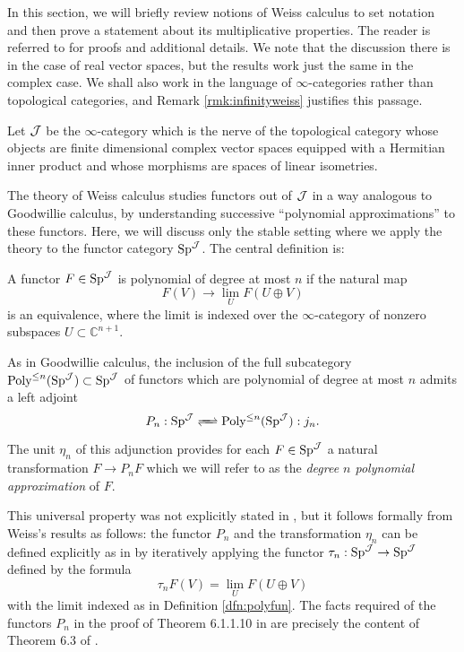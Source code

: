 

In this section, we will briefly review notions of Weiss calculus to set notation and then prove a statement about its multiplicative properties.  The reader is referred to \cite{Weiss} for proofs and additional details.  We note that the discussion there is in the case of real vector spaces, but the results work just the same in the complex case.  We shall also work in the language of $\infty$-categories rather than topological categories, and Remark \ref{rmk:infinityweiss} justifies this passage.  

Let $\operatorname{\mathcal{J}}$ be the $\infty$-category which is the nerve of the topological category whose objects are finite dimensional complex vector spaces equipped with a Hermitian inner product and whose morphisms are spaces of linear isometries.  

The theory of Weiss calculus studies functors out of $\operatorname{\mathcal{J}}$ in a way analogous to Goodwillie calculus, by understanding successive ``polynomial approximations'' to these functors.  Here, we will discuss only the stable setting where we apply the theory to the functor category $\operatorname{\text{Sp}}^{\operatorname{\mathcal{J}}}$. The central definition is:

\begin{dfn}\label{dfn:polyfun}
A functor $F\in \operatorname{\text{Sp}}^{\operatorname{\mathcal{J}}}$ is polynomial of degree at most $n$ if the natural map $$F(V) \to \lim_U F(U\oplus V)$$ is an equivalence, where the limit is indexed over the $\infty$-category of nonzero subspaces $U\subset \mathbb{C}^{n+1}.$
\end{dfn}

As in Goodwillie calculus, the inclusion of the full subcategory $\operatorname{\text{Poly}}^{\leq n}(\operatorname{\text{Sp}}^{\operatorname{\mathcal{J}}}) \subset \operatorname{\text{Sp}}^{\operatorname{\mathcal{J}}}$ of functors which are polynomial of degree at most $n$ admits a left adjoint $$P_n: \Sp^{\J} \xrightleftharpoons{\quad} \Poly^{\leq n}(\Sp^{\J}): j_n.$$ %
 The unit $\eta_n$ of this adjunction provides for each $F\in \operatorname{\text{Sp}}^{\operatorname{\mathcal{J}}}$ a natural transformation $F \to P_nF$ which we will refer to as the \emph{degree $n$ polynomial approximation} of $F$. 

\begin{rmk}\label{rmk:infinityweiss}
This universal property was not explicitly stated in \cite{Weiss}, but it follows formally from Weiss's results as follows: the functor $P_n$ and the transformation $\eta_n$ can be defined explicitly as in \cite{Weiss} by iteratively applying the functor $\tau_n: \operatorname{\text{Sp}}^{\operatorname{\mathcal{J}}} \to \operatorname{\text{Sp}}^{\operatorname{\mathcal{J}}}$ defined by the formula $$\tau_n F(V) = \lim_U F(U\oplus V)$$ with the limit indexed as in Definition \ref{dfn:polyfun}.   The facts required of the functors $P_n$ in the proof of Theorem 6.1.1.10 in \cite{HA} are precisely the content of Theorem 6.3 of \cite{Weiss}.  
\end{rmk}


